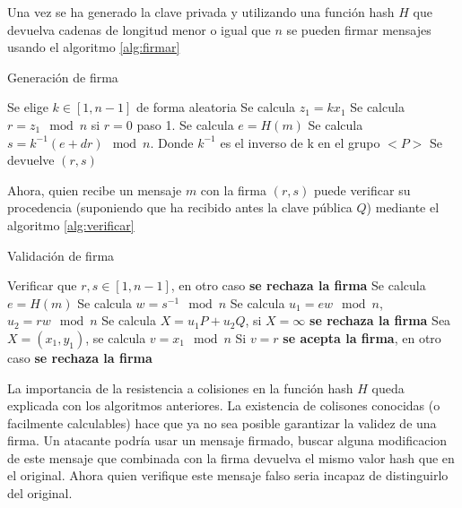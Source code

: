 Una vez se ha generado la clave privada y utilizando una función hash $H$ que devuelva cadenas de longitud menor o igual que $n$ se pueden firmar mensajes usando el algoritmo \ref{alg:firmar}
\begin{algorithm}[H]
\caption{Generación de firma}\label{alg:firmar}
\begin{algorithmic}[1]
\Repeat
\State Se elige $k \in [1, n-1]$ de forma aleatoria
\State Se calcula $z_{1} = kx_{1}$ 
\State Se calcula  $r = z_{1}  \mod n$ si $r = 0$ paso 1.
\State Se calcula $e = H(m)$
\State Se calcula $s = k^{-1}(e + dr)  \mod n$. Donde $k^{-1}$ es el inverso de k en el grupo $<P>$
\State Se devuelve $(r,s)$
\end{algorithmic}
\end{algorithm}

Ahora, quien recibe un mensaje $m$ con la firma $(r,s)$ puede verificar su procedencia (suponiendo que ha recibido antes la clave pública $Q$) mediante el algoritmo \ref{alg:verificar}

\begin{algorithm}
\caption{Validación de firma}\label{alg:verificar}
\begin{algorithmic}[1]
\State Verificar que $r,s \in [1, n-1]$, en otro caso \textbf{se rechaza la firma}
\State Se calcula $e = H(m)$
\State Se calcula $w = s^{-1}  \mod n$
\State Se calcula $u_{1} = ew  \mod n$, $u_{2} = rw  \mod n$
\State Se calcula $X = u_{1}P + u_{2}Q$, si $X=\infty$ \textbf{se rechaza la firma} 
\State Sea $X = (x_{1},y_{1})$, se calcula $v = x_{1} \mod n$
\State Si $v = r$ \textbf{se acepta la firma}, en otro caso \textbf{se rechaza la firma}
\end{algorithmic}
\end{algorithm}

La importancia de la resistencia a colisiones en la función hash $H$ queda explicada con los algoritmos anteriores.
La existencia de colisones conocidas (o facilmente calculables) hace que ya no sea posible garantizar la validez de una firma. Un atacante podría usar un mensaje firmado, buscar alguna modificacion de este mensaje que combinada con la firma devuelva el mismo valor hash que en el original. Ahora quien verifique este mensaje falso seria incapaz de distinguirlo del original.


